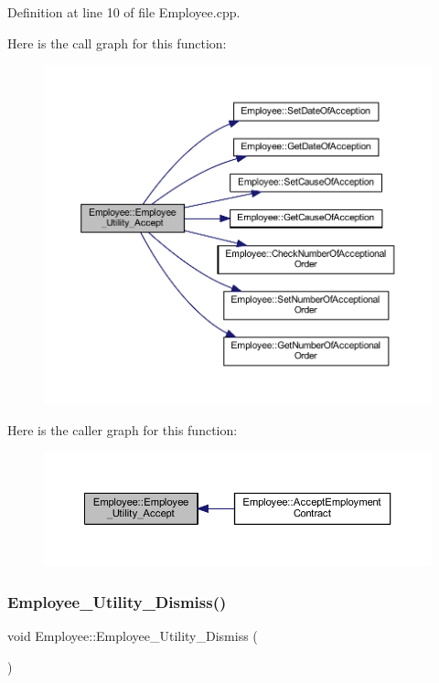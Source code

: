 Definition at line 10 of file Employee.\+cpp.

Here is the call graph for this function\+:
\nopagebreak
\begin{figure}[H]
\begin{center}
\leavevmode
\includegraphics[width=350pt]{class_employee_a534f83eb6f2f106f72d802fcae00eb14_cgraph}
\end{center}
\end{figure}
Here is the caller graph for this function\+:
\nopagebreak
\begin{figure}[H]
\begin{center}
\leavevmode
\includegraphics[width=350pt]{class_employee_a534f83eb6f2f106f72d802fcae00eb14_icgraph}
\end{center}
\end{figure}
\mbox{\label{class_employee_a6d9c2cbf05d3137a24c322b1525fffa2}} 
\subsubsection{\texorpdfstring{Employee\+\_\+\+Utility\+\_\+\+Dismiss()}{Employee\_Utility\_Dismiss()}}
{\footnotesize\ttfamily void Employee\+::\+Employee\+\_\+\+Utility\+\_\+\+Dismiss (\begin{DoxyParamCaption}{ }\end{DoxyParamCaption})\hspace{0.3cm}{\ttfamily [private]}}



